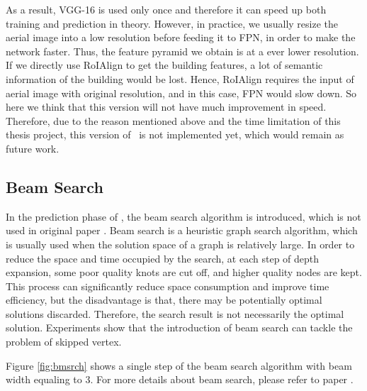 

As a result, VGG-16 is used only once and therefore it can speed up both training and prediction in theory. However, in practice, we usually resize the aerial image into a low resolution before feeding it to FPN, in order to make the network faster. Thus, the feature pyramid we obtain is at a ever lower resolution. If we directly use RoIAlign to get the building features, a lot of semantic information of the building would be lost. Hence, RoIAlign requires the input of aerial image with original resolution, and in this case, FPN would slow down. So here we think that this version will not have much improvement in speed. Therefore, due to the reason mentioned above and the time limitation of this thesis project, this version of \modelnameshort\ is not implemented yet, which would remain as future work. 

\subsection{Beam Search}\label{bmsrch}
In the prediction phase of \modelnameshort, the beam search algorithm is introduced, which is not used in original paper \cite{polygonrnn}. Beam search is a heuristic graph search algorithm, which is usually used when the solution space of a graph is relatively large. In order to reduce the space and time occupied by the search, at each step of depth expansion, some poor quality knots are cut off, and higher quality nodes are kept. This process can significantly reduce space consumption and improve time efficiency, but the disadvantage is that, there may be potentially optimal solutions discarded. Therefore, the search result is not necessarily the optimal solution. Experiments show that the introduction of beam search can tackle the problem of skipped vertex.

Figure \ref{fig:bmsrch} shows a single step of the beam search algorithm with beam width equaling to 3. For more details about beam search, please refer to paper \cite{seq2seq}.





